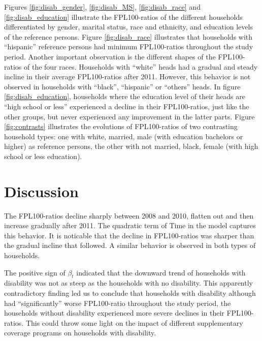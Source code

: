 \documentclass[11pt]{extarticle} %
\begin{document}
Figures \ref{fig:disab_gender}, \ref{fig:disab_MS}, \ref{fig:disab_race} and \ref{fig:disab_education} illustrate the FPL100-ratios of the different households differentiated by gender, marital status, race and ethnicity, and education levels of the reference persons. Figure \ref{fig:disab_race} illustrates that households with ``hispanic'' reference persons had minimum FPL100-ratios throughout the study period. Another important observation is the different shapes of the FPL100-ratios of the four races. Households with ``white'' heads had a gradual and steady incline in their average FPL100-ratios after 2011. However, this behavior is not observed in households with ``black'', ``hispanic'' or ``others'' heads. In figure \ref{fig:disab_education}, households where the education level of their heads are ``high school or less'' experienced a decline in their FPL100-ratios, just like the other groups, but never experienced any improvement in the latter parts. Figure \ref{fig:contrasts} illustrates the evolutions of FPL100-ratios of two contrasting household types: one with white, married, male (with education bachelors or higher) as reference persons, the other with not married, black, female (with high school or less education). 


\section*{Discussion}
The FPL100-ratios decline sharply between 2008 and 2010, flatten out and then increase gradually after 2011. The quadratic term of Time in the model captures this behavior. It is noticable that the decline in FPL100-ratios was sharper than the gradual incline that followed. A similar behavior is observed in both types of households. 

The positive sign of $\beta_t$ indicated that the downward trend of households with disability was not as steep as the households with no disability. This apparently contradictory finding led us to conclude that households with disability although had ``significantly'' worse FPL100-ratio throughout the study period, the households without disability experienced more severe declines in their FPL100-ratios. This could throw some light on the impact of different supplementary coverage programs on households with disability.
\end{document}
